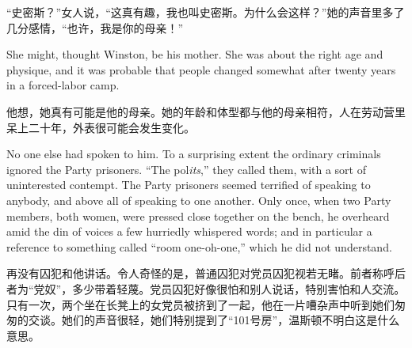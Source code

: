 \begin{paracol}{2}
\switchcolumn

``史密斯？''女人说，``这真有趣，我也叫史密斯。为什么会这样？''她的声音里多了几分感情，``也许，我是你的母亲！''

\switchcolumn*

She might, thought Winston, be his mother. She was about the right age
and physique, and it was probable that people changed somewhat after
twenty years in a forced-labor camp.

\switchcolumn

他想，她真有可能是他的母亲。她的年龄和体型都与他的母亲相符，人在劳动营里呆上二十年，外表很可能会发生变化。

\switchcolumn*

No one else had spoken to him. To a surprising extent the ordinary
criminals ignored the Party prisoners. ``The pol\emph{its},'' they called
them, with a sort of uninterested contempt. The Party prisoners seemed
terrified of speaking to anybody, and above all of speaking to one
another. Only once, when two Party members, both women, were pressed
close together on the bench, he overheard amid the din of voices a few
hurriedly whispered words; and in particular a reference to something
called ``room one-oh-one,'' which he did not understand.

\switchcolumn

再没有囚犯和他讲话。令人奇怪的是，普通囚犯对党员囚犯视若无睹。前者称呼后者为``党奴''，多少带着轻蔑。党员囚犯好像很怕和别人说话，特别害怕和人交流。只有一次，两个坐在长凳上的女党员被挤到了一起，他在一片嘈杂声中听到她们匆匆的交谈。她们的声音很轻，她们特别提到了``101号房''，温斯顿不明白这是什么意思。

\switchcolumn*


\end{paracol}

